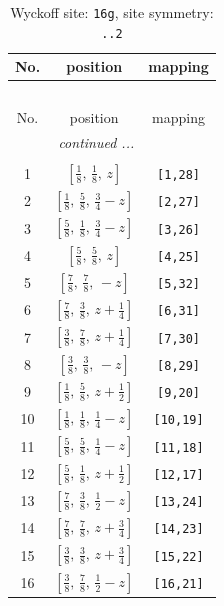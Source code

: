 \documentclass[fleqn,8pt]{jsarticle}
\begin{document}
\renewcommand{\arraystretch}{1.2}
\begin{longtable}{ccc}
\caption{Wyckoff site: {\tt 16g}, site symmetry: {\tt ..2}}
 \\
 \hline \hline
No. & position & mapping \\ \hline \endfirsthead

\multicolumn{2}{l}{\tablename\ \thetable{}} \\
 \hline \hline
No. & position & mapping \\ \hline \endhead

 \hline \hline
\multicolumn{2}{r}{\footnotesize\it continued ...} \\ \endfoot

 \hline \hline
\multicolumn{2}{r}{} \\ \endlastfoot

1 & $\left[ \frac{1}{8},\, \frac{1}{8},\, z \right]$ & {\tt [1,28]} \\ \hline
2 & $\left[ \frac{1}{8},\, \frac{5}{8},\, \frac{3}{4} - z \right]$ & {\tt [2,27]} \\ \hline
3 & $\left[ \frac{5}{8},\, \frac{1}{8},\, \frac{3}{4} - z \right]$ & {\tt [3,26]} \\ \hline
4 & $\left[ \frac{5}{8},\, \frac{5}{8},\, z \right]$ & {\tt [4,25]} \\ \hline
5 & $\left[ \frac{7}{8},\, \frac{7}{8},\, - z \right]$ & {\tt [5,32]} \\ \hline
6 & $\left[ \frac{7}{8},\, \frac{3}{8},\, z + \frac{1}{4} \right]$ & {\tt [6,31]} \\ \hline
7 & $\left[ \frac{3}{8},\, \frac{7}{8},\, z + \frac{1}{4} \right]$ & {\tt [7,30]} \\ \hline
8 & $\left[ \frac{3}{8},\, \frac{3}{8},\, - z \right]$ & {\tt [8,29]} \\ \hline
9 & $\left[ \frac{1}{8},\, \frac{5}{8},\, z + \frac{1}{2} \right]$ & {\tt [9,20]} \\ \hline
10 & $\left[ \frac{1}{8},\, \frac{1}{8},\, \frac{1}{4} - z \right]$ & {\tt [10,19]} \\ \hline
11 & $\left[ \frac{5}{8},\, \frac{5}{8},\, \frac{1}{4} - z \right]$ & {\tt [11,18]} \\ \hline
12 & $\left[ \frac{5}{8},\, \frac{1}{8},\, z + \frac{1}{2} \right]$ & {\tt [12,17]} \\ \hline
13 & $\left[ \frac{7}{8},\, \frac{3}{8},\, \frac{1}{2} - z \right]$ & {\tt [13,24]} \\ \hline
14 & $\left[ \frac{7}{8},\, \frac{7}{8},\, z + \frac{3}{4} \right]$ & {\tt [14,23]} \\ \hline
15 & $\left[ \frac{3}{8},\, \frac{3}{8},\, z + \frac{3}{4} \right]$ & {\tt [15,22]} \\ \hline
16 & $\left[ \frac{3}{8},\, \frac{7}{8},\, \frac{1}{2} - z \right]$ & {\tt [16,21]} \\
\end{longtable}
\end{document}
